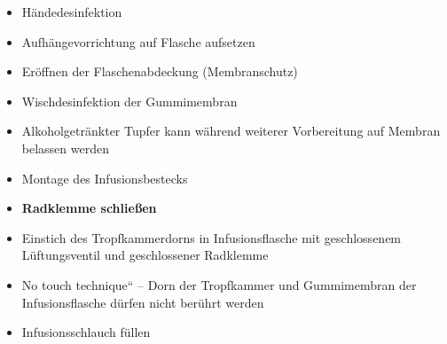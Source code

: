 \documentclass{article}
\newcommand\gEs[1]{\textbf{\textcolor[rgb]{0.0,0.0,0.5019608}{#1}}}
\newcommand\gEs[1]{\textbf{\textcolor[rgb]{0.0,0.0,0.5019608}{#1}}}
\begin{document}
\begin{itemize}
\item {\mdseries
H\"andedesinfektion         }

\item {\mdseries
Aufh\"angevorrichtung auf Flasche aufsetzen}

\item {\mdseries
Er\"offnen der Flaschenabdeckung (Membranschutz)}

\item {\mdseries
Wischdesinfektion der Gummimembran}

\end{itemize}
\begin{itemize}
\item {\mdseries
Alkoholgetr\"ankter Tupfer kann w\"ahrend weiterer Vorbereitung auf
Membran belassen werden}

\end{itemize}
\begin{itemize}
\item {\mdseries
Montage des Infusionsbestecks}

\end{itemize}
\begin{itemize}
\item {\mdseries
\gEs{Radklemme schlie{\ss}en} }

\item {\mdseries
Einstich des Tropfkammerdorns in Infusionsflasche mit geschlossenem
L\"uftungsventil und geschlossener Radklemme}

\item {\mdseries
{\quotedblbase}No touch technique{\textquotedblleft} -- Dorn der
Tropfkammer und Gummimembran der Infusionsflasche d\"urfen nicht
ber\"uhrt werden}

\end{itemize}
\begin{itemize}
\item {\mdseries
Infusionsschlauch f\"ullen}

\end{itemize}
\end{document}
